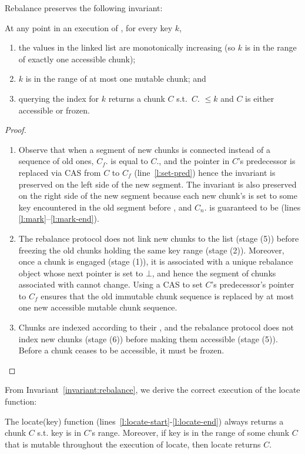 Rebalance preserves the following invariant:
\begin{invariant}
At any point in an execution of \kiwi, for every key $k$,  
\begin{enumerate}
\item the  values in the linked list are monotonically increasing (so $k$ is in the range of exactly one accessible chunk);  
\item  $k$ is in the range of at most one mutable chunk; and 
\item querying the index for $k$  returns a chunk $C$ s.t.\  $C$. $\le k$ and $C$ is either accessible or frozen.
\end{enumerate}
\label{invariant:rebalance}
\end{invariant}
\begin{proof}
\begin{enumerate}
\item
Observe that when a segment of new chunks is connected instead of a sequence of old ones, $C_f$. is equal to $C$., 
and  the  pointer in $C$'s predecessor is replaced via CAS from $C$ to $C_f$ (line~\ref{l:set-pred}) hence the invariant is preserved on the left side of the new segment.
The invariant is also preserved on the right side of the new segment because each new chunk's  is set to some key encountered in the old segment before , 
and $C_n$. is guaranteed to be  (lines  \ref{l:mark}--\ref{l:mark-end}).  
\item
The rebalance protocol does not link new chunks to the list (stage (5)) 
before freezing the old chunks holding the same key range (stage (2)).
Moreover, once a chunk is engaged (stage (1)), it is associated with a unique rebalance object 
whose next pointer is set to $\bot$, 
and hence the segment of chunks associated with  cannot change. 
Using a CAS to set $C$'s predecessor's  pointer to $C_f$ ensures 
that the old immutable chunk sequence is replaced by at most one new accessible mutable chunk sequence.
\item
Chunks are indexed according to their , and 
the rebalance protocol does not index new chunks (stage (6)) before making them accessible (stage (5)). 
Before a chunk ceases to be accessible, it must be frozen. 
\end{enumerate}
\end{proof}

From Invariant~\ref{invariant:rebalance}, we derive the correct execution of the locate function:
\begin{corollary}\label{corollary:locate}
The locate(key) function  (lines~\ref{l:locate-start}-\ref{l:locate-end}) always returns a chunk $C$ s.t. key is in $C$'s range.
Moreover, if key is in the range of some chunk $C$ that is mutable throughout the execution of locate, then locate returns $C$.
\end{corollary}

